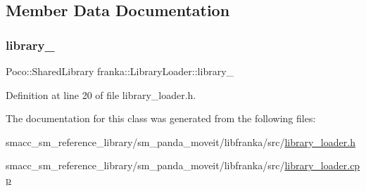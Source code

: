 \subsection{Member Data Documentation}
\mbox{\label{classfranka_1_1LibraryLoader_aa60d8a00447a53d4c754c9959adf39e1}} 
\subsubsection{\texorpdfstring{library\+\_\+}{library\_}}
{\footnotesize\ttfamily Poco\+::\+Shared\+Library franka\+::\+Library\+Loader\+::library\+\_\+\hspace{0.3cm}{\ttfamily [private]}}



Definition at line 20 of file library\+\_\+loader.\+h.



The documentation for this class was generated from the following files\+:\begin{DoxyCompactItemize}
\item 
smacc\+\_\+sm\+\_\+reference\+\_\+library/sm\+\_\+panda\+\_\+moveit/libfranka/src/\hyperlink{library__loader_8h}{library\+\_\+loader.\+h}\item 
smacc\+\_\+sm\+\_\+reference\+\_\+library/sm\+\_\+panda\+\_\+moveit/libfranka/src/\hyperlink{library__loader_8cpp}{library\+\_\+loader.\+cpp}\end{DoxyCompactItemize}
